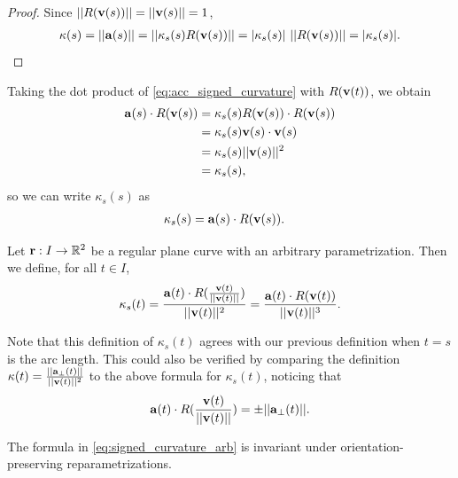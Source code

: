 \documentclass[12pt,letterpaper,reqno]{article}
\numberwithin{equation}{section}
\newcommand{\R}{\ensuremath{\mathbb R}}
\newcommand{\bv}{{\bf v}}
\newcommand{\ba}{{\bf a}}
\newcommand{\bbr}{{\bf r}}
\newcommand{\fixme}[1]{{\color{orange}{[#1]}}}
\begin{document}
{\begin{proof}
	Since $||R(\bv(s))||=||\bv(s)||=1$,
	\begin{align*}
		\kappa(s)=||\ba(s)||=||\kappa_s(s)R(\bv(s))||=|\kappa_s(s)| \ ||R(\bv(s))||=|\kappa_s(s)|.
	\end{align*}
\end{proof}

Taking the dot product of \eqref{eq:acc_signed_curvature} with $R(\bv(t))$, we obtain
\begin{align*}
	\ba(s) \cdot R(\bv(s))&=\kappa_s(s) R(\bv(s)) \cdot R(\bv(s))\\
	&=\kappa_s(s) \bv(s) \cdot \bv(s) \\
	&=\kappa_s(s) ||\bv(s)||^2 \\
	&=\kappa_s(s),
\end{align*}
so we can write $\kappa_s(s)$ as 
\begin{align}
	\kappa_s(s)&=\ba(s) \cdot R(\bv(s)).
\end{align}

\begin{defn}
Let $\bbr:I \to \R^2$ be a regular plane curve with an arbitrary parametrization. Then we define, for all $t \in I$,
\begin{align}\label{eq:signed_curvature_arb}
	\kappa_s(t)=\frac{\ba(t) \cdot R(\frac{\bv(t)}{||\bv(t)||})}{||\bv(t)||^2}=\frac{\ba(t) \cdot R(\bv(t))}{||\bv(t)||^3}.
\end{align}	
\end{defn}
Note that this definition of $\kappa_s(t)$ agrees with our previous definition when $t=s$ is the arc length. This could also be verified by comparing the definition $\kappa(t)=\frac{||\ba_\perp(t)||}{||\bv(t)||^2}$ to the above formula for $\kappa_s(t)$, noticing that \fixme{Elaborate.}
\begin{align*}
	\ba(t) \cdot R(\frac{\bv(t)}{||\bv(t)||})=\pm ||\ba_\perp(t)||.
\end{align*}

\begin{prop}\label{prop:signed_curvature_inv}
The formula in \eqref{eq:signed_curvature_arb} is invariant under orientation-preserving reparametrizations.	
\end{prop}

}
\end{document}
